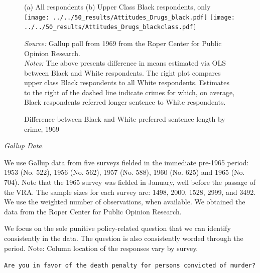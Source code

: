 \documentclass[12pt]{article}
\newenvironment{shift}{\begin{adjustwidth}{1cm}{}}{\end{adjustwidth}}
\begin{document}
\begin{figure}[h!]
 \begin{center}
 \caption{Difference between Black and White preferred sentence length by crime, 1969}
 \small
 			(a) All respondents  \hspace*{1.2in}  (b) Upper Class Black respondents, only \\
		 \texttt{[image: ../../50\_results/Attitudes\_Drugs\_black.pdf]}
		 \texttt{[image: ../../50\_results/Attitudes\_Drugs\_blackclass.pdf]}
 \label{figure_dope}
 	\end{center}
 	{\scriptsize{\emph{Source:} Gallup poll from 1969 from the Roper Center for Public Opinion Research. }} \\
	{\scriptsize{\emph{Notes:} The above presents difference in means estimated via OLS between Black and White respondents.  The right plot compares upper class Black respondents to all White respondents.  Estimates to the right of the dashed line indicate crimes for which, on average, Black respondents referred longer sentence to White respondents.  \singlespacing }}
\end{figure} \normalsize





\vspace{.1in}
\emph{Gallup Data}.

We use Gallup data from five surveys fielded in the immediate pre-1965 period: 1953 (No. 522), 1956 (No. 562), 1957 (No. 588), 1960 (No. 625) and 1965 (No. 704).  Note that the 1965 survey was fielded in January, well before the passage of the VRA.  The sample sizes for each survey are: 1498, 2000, 1528, 2999, and 3492.  We use the weighted number of observations, when available.  We obtained the data from the Roper Center for Public Opinion Research.

We focus on the sole punitive policy-related question that we can identify consistently in the data.  The question is also consistently worded through the period.  Note: Column location of the responses vary by survey.

\vspace{.1in}
\begin{shift} \footnotesize
	\vspace{.01in}
	\texttt{Are you in favor of the death penalty for persons convicted of murder? }
\end{shift}
\end{document}
